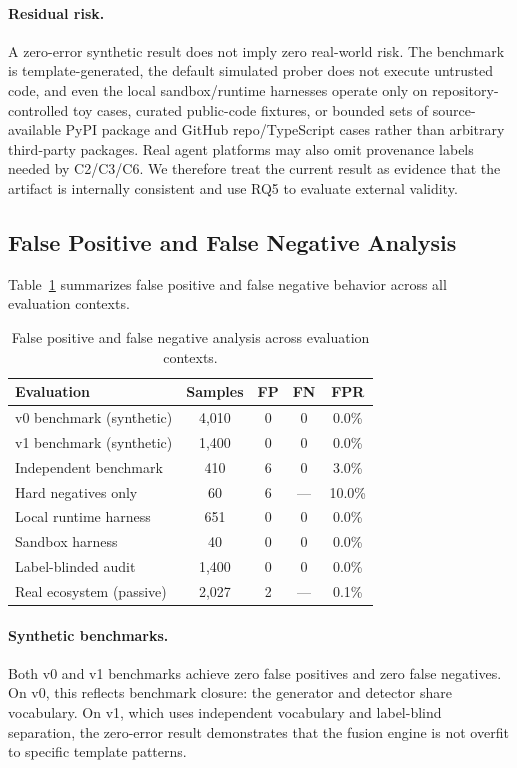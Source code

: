 \documentclass[10pt]{article}
\begin{document}
\paragraph{Residual risk.}
 A zero-error synthetic result does not imply zero real-world risk. The benchmark is template-generated, the default simulated prober does not execute untrusted code, and even the local sandbox/runtime harnesses operate only on repository-controlled toy cases, curated public-code fixtures, or bounded sets of source-available PyPI package and GitHub repo/TypeScript cases rather than arbitrary third-party packages. Real agent platforms may also omit provenance labels needed by C2/C3/C6. We therefore treat the current result as evidence that the artifact is internally consistent and use RQ5 to evaluate external validity.

\subsection{False Positive and False Negative Analysis}
\label{sec:fp_fn}

Table~\ref{tab:fp_fn} summarizes false positive and false negative behavior across all evaluation contexts.

\begin{table}[t]
\centering
\caption{False positive and false negative analysis across evaluation contexts.}
\label{tab:fp_fn}
\begin{tabular}{lcccc}
\toprule
Evaluation & Samples & FP & FN & FPR \\
\midrule
v0 benchmark (synthetic) & 4{,}010 & 0 & 0 & 0.0\% \\
v1 benchmark (synthetic) & 1{,}400 & 0 & 0 & 0.0\% \\
Independent benchmark & 410 & 6 & 0 & 3.0\% \\
\quad Hard negatives only & 60 & 6 & --- & 10.0\% \\
Local runtime harness & 651 & 0 & 0 & 0.0\% \\
Sandbox harness & 40 & 0 & 0 & 0.0\% \\
Label-blinded audit & 1{,}400 & 0 & 0 & 0.0\% \\
Real ecosystem (passive) & 2{,}027 & 2 & --- & 0.1\% \\
\bottomrule
\end{tabular}
\end{table}

\paragraph{Synthetic benchmarks.}
Both v0 and v1 benchmarks achieve zero false positives and zero false negatives. On v0, this reflects benchmark closure: the generator and detector share vocabulary. On v1, which uses independent vocabulary and label-blind separation, the zero-error result demonstrates that the fusion engine is not overfit to specific template patterns.
\end{document}

